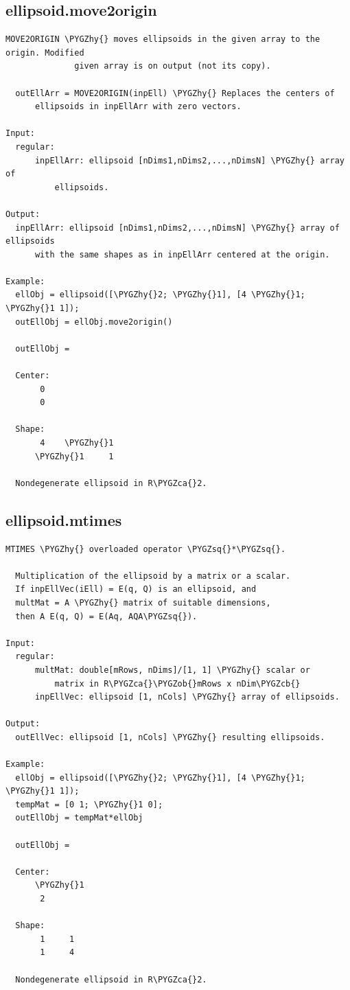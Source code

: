 \documentclass[letterpaper,10pt,english]{sphinxmanual}
\def\PYGZob{\char`\{}
\def\PYGZcb{\char`\}}
\def\PYGZca{\char`\^}
\def\PYGZhy{\char`\-}
\def\PYGZsq{\char`\'}
\begin{document}
\subsection{ellipsoid.move2origin}
\label{chap_functions:ellipsoid-move2origin}
\begin{Verbatim}[commandchars=\\\{\}]
MOVE2ORIGIN \PYGZhy{} moves ellipsoids in the given array to the origin. Modified
              given array is on output (not its copy).

  outEllArr = MOVE2ORIGIN(inpEll) \PYGZhy{} Replaces the centers of
      ellipsoids in inpEllArr with zero vectors.

Input:
  regular:
      inpEllArr: ellipsoid [nDims1,nDims2,...,nDimsN] \PYGZhy{} array of
          ellipsoids.

Output:
  inpEllArr: ellipsoid [nDims1,nDims2,...,nDimsN] \PYGZhy{} array of ellipsoids
      with the same shapes as in inpEllArr centered at the origin.

Example:
  ellObj = ellipsoid([\PYGZhy{}2; \PYGZhy{}1], [4 \PYGZhy{}1; \PYGZhy{}1 1]);
  outEllObj = ellObj.move2origin()

  outEllObj =

  Center:
       0
       0

  Shape:
       4    \PYGZhy{}1
      \PYGZhy{}1     1

  Nondegenerate ellipsoid in R\PYGZca{}2.
\end{Verbatim}


\subsection{ellipsoid.mtimes}
\label{chap_functions:ellipsoid-mtimes}
\begin{Verbatim}[commandchars=\\\{\}]
MTIMES \PYGZhy{} overloaded operator \PYGZsq{}*\PYGZsq{}.

  Multiplication of the ellipsoid by a matrix or a scalar.
  If inpEllVec(iEll) = E(q, Q) is an ellipsoid, and
  multMat = A \PYGZhy{} matrix of suitable dimensions,
  then A E(q, Q) = E(Aq, AQA\PYGZsq{}).

Input:
  regular:
      multMat: double[mRows, nDims]/[1, 1] \PYGZhy{} scalar or
          matrix in R\PYGZca{}\PYGZob{}mRows x nDim\PYGZcb{}
      inpEllVec: ellipsoid [1, nCols] \PYGZhy{} array of ellipsoids.

Output:
  outEllVec: ellipsoid [1, nCols] \PYGZhy{} resulting ellipsoids.

Example:
  ellObj = ellipsoid([\PYGZhy{}2; \PYGZhy{}1], [4 \PYGZhy{}1; \PYGZhy{}1 1]);
  tempMat = [0 1; \PYGZhy{}1 0];
  outEllObj = tempMat*ellObj

  outEllObj =

  Center:
      \PYGZhy{}1
       2

  Shape:
       1     1
       1     4

  Nondegenerate ellipsoid in R\PYGZca{}2.
\end{Verbatim}
\end{document}
